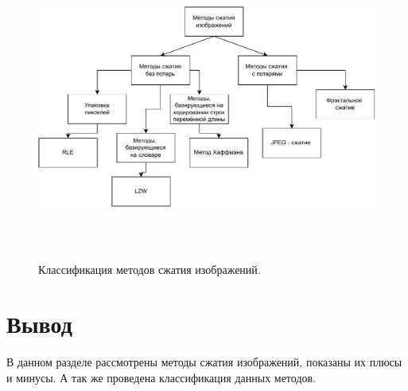     \begin{figure}[h!]
    	\centering
    	\includegraphics[width=\textwidth,height=10cm,keepaspectratio]{klassData.pdf}
    	\caption{Классификация методов сжатия изображений.} \label{fig:klassData}
    \end{figure}

    \section{Вывод}
    
    В данном разделе рассмотрены методы сжатия изображений, показаны их плюсы и минусы. А так же проведена классификация данных методов.
